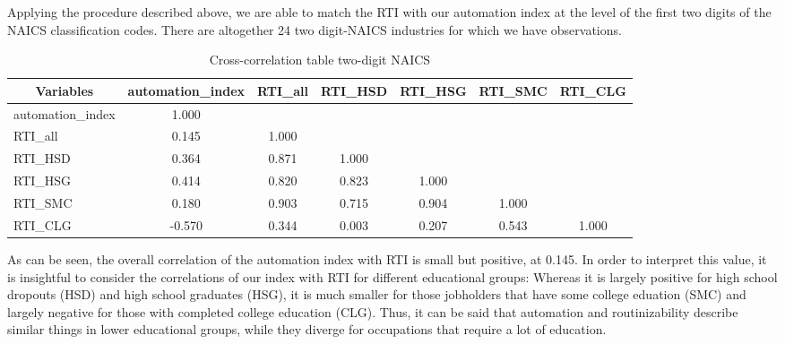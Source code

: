 \documentclass[11pt,a4paper,fleqn]{article}
\begin{document}
Applying the procedure described above, we are able to match the RTI with our automation index at the level of the first two digits of the NAICS classification codes. There are altogether 24 two digit-NAICS industries for which we have observations.

\begin{comment}
\begin{table}[htbp]\centering \small \caption{Cross-correlation table one-digit NAICS\label{corrtable1}}
	\begin{tabular}{l  c  c  c  c  c  c }\hline\hline
		\multicolumn{1}{c}{Variables} &automation\_index&RTI\_all&
		RTI\_HSD&RTI\_HSG&RTI\_SMC&RTI\_CLG\\ \hline
		automation\_index&1.000\\
		RTI\_all&0.607&1.000\\
		RTI\_HSD&0.764&0.878&1.000\\
		RTI\_HSG&0.693&0.935&0.870&1.000\\
		RTI\_SMC&0.541&0.940&0.724&0.921&1.000\\
		RTI\_CLG&-0.418&0.191&-0.212&0.216&0.421&1.000\\
		\hline \hline 
	\end{tabular}
\end{table}
\end{comment}

\vspace{0.5cm}
\begin{table}[htbp]\centering \small \caption{Cross-correlation table two-digit NAICS\label{corrtable2}}
	\begin{tabular}{l  c  c  c  c  c  c }\toprule
		\multicolumn{1}{c}{Variables} &automation\_index&RTI\_all&
		RTI\_HSD&RTI\_HSG&RTI\_SMC&RTI\_CLG\\ \midrule
		automation\_index&1.000\\
		RTI\_all&0.145&1.000\\
		RTI\_HSD&0.364&0.871&1.000\\
		RTI\_HSG&0.414&0.820&0.823&1.000\\
		RTI\_SMC&0.180&0.903&0.715&0.904&1.000\\
		RTI\_CLG&-0.570&0.344&0.003&0.207&0.543&1.000\\
		\bottomrule 
	\end{tabular}
\end{table}
\vspace{0.5cm}

As can be seen, the overall correlation of the automation index with RTI is small but positive, at 0.145. In order to interpret this value, it is insightful to consider the correlations of our index with RTI for different educational groups: Whereas it is largely positive for high school dropouts (HSD) and high school graduates (HSG), it is much smaller for those jobholders that have some college eduation (SMC) and largely negative for those with completed college education (CLG). Thus, it can be said that automation and routinizability describe similar things in lower educational groups, while they diverge for occupations that require a lot of education.
\end{document}
